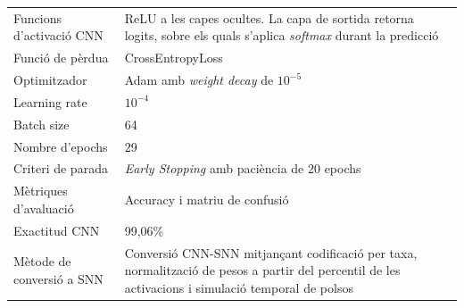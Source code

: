 \documentclass[a4paper,11pt, titlepage, twoside]{article}
\begin{document}
\begin{appendices}
\begin{table}[H]
\begin{tabular}{p{4.2cm} p{8.5cm}}
			Funcions d'activació CNN
			                   & ReLU a les capes ocultes. La capa de sortida retorna logits, sobre els quals s'aplica \textit{softmax} durant la predicció                         \\

			Funció de pèrdua
			                   & CrossEntropyLoss                                                                                                                                   \\

			Optimitzador
			                   & Adam amb \textit{weight decay} de $10^{-5}$                                                                                                        \\

			Learning rate
			                   & $10^{-4}$                                                                                                                                          \\

			Batch size
			                   & 64                                                                                                                                                 \\

			Nombre d'epochs
			                   & 29                                                                                                                                                 \\

			Criteri de parada
			                   & \textit{Early Stopping} amb paciència de 20 epochs                                                                                                 \\

			Mètriques d'avaluació
			                   & Accuracy i matriu de confusió                                                                                                                      \\

			Exactitud CNN
			                   & 99,06\%                                                                                                                                            \\

			Mètode de conversió a SNN
			                   & Conversió CNN-SNN mitjançant codificació per taxa, normalització de pesos a partir del percentil de les activacions i simulació temporal de polsos \\


\end{tabular}
\end{table}
\end{appendices}
\end{document}
